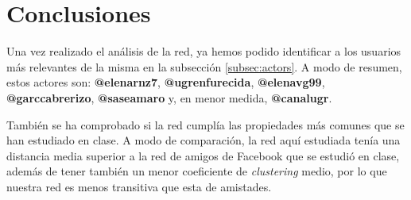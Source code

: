 \section{Conclusiones}

Una vez realizado el análisis de la red, ya hemos podido identificar a los
usuarios más relevantes de la misma en la subsección \ref{subsec:actors}. A modo
de resumen, estos actores son: \textbf{@elenarnz7}, \textbf{@ugrenfurecida}, \textbf{@elenavg99},
\textbf{@garccabrerizo}, \textbf{@saseamaro} y, en menor medida,
\textbf{@canalugr}.

También se ha comprobado si la red cumplía las propiedades más comunes que se
han estudiado en clase. A modo de comparación, la red aquí estudiada tenía una
distancia media superior a la red de amigos de Facebook que se estudió en clase,
además de tener también un menor coeficiente de \textit{clustering} medio, por
lo que nuestra red es menos transitiva que esta de amistades.
